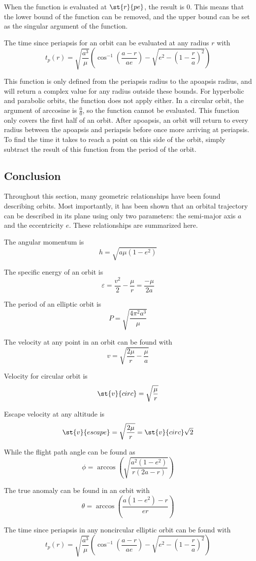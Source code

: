 \documentclass[../basicOrbitalDynamics.tex]{subfiles}
\begin{document}
When the function is evaluated at $\st{r}{pe}$, the result is $0$. This means that the lower bound of the function can be removed, and the upper bound can be set as the singular argument of the function.

The time since periapsis for an orbit can be evaluated at any radius $r$ with
\begin{equation}\label{Time since periapsis}
    t_p(r)=\sqrt{\frac{a^3}{\mu}}\left(\cos^{-1}\left(\frac{a-r}{ae}\right)- \sqrt{e^2-\left(1-\frac{r}{a}\right)^2}\right)
\end{equation}

This function is only defined from the periapsis radius to the apoapsis radius, and will return a complex value for any radius outside these bounds. For hyperbolic and parabolic orbits, the function does not apply either. In a circular orbit, the argument of arccosine is $\frac{0}{0}$, so the function cannot be evaluated. This function only covers the first half of an orbit. After apoapsis, an orbit will return to every radius between the apoapsis and periapsis before once more arriving at periapsis. To find the time it takes to reach a point on this side of the orbit, simply subtract the result of this function from the period of the orbit.

\bigskip\bigskip
\subsection{Conclusion}

Throughout this section, many geometric relationships have been found describing orbits. Most importantly, it has been shown that an orbital trajectory can be described in its plane using only two parameters: the semi-major axis $a$ and the eccentricity $e$. These relationships are summarized here.

\bigskip
The angular momentum is
$$h=\sqrt{a\mu(1-e^2)}$$

\bigskip
The specific energy of an orbit is
$$\varepsilon=\frac{v^2}{2}-\frac{\mu}{r}=\frac{-\mu}{2a}$$

\bigskip
The period of an elliptic orbit is
$$P=\sqrt{\frac{4\pi^2a^3}{\mu}}$$

\bigskip
The velocity at any point in an orbit can be found with
$$v=\sqrt{\frac{2\mu}{r}-\frac{\mu}{a}}$$

Velocity for circular orbit is
$$\st{v}{circ}=\sqrt{\frac{\mu}{r}}$$

Escape velocity at any altitude is
$$\st{v}{escape}=\sqrt{\frac{2\mu}{r}}=\st{v}{circ}\sqrt{2}$$

\bigskip
While the flight path angle can be found as
$$\phi=\arccos\left(\sqrt{\frac{a^2(1-e^2)}{r(2a-r)}}\right)$$

\bigskip
The true anomaly can be found in an orbit with
$$\theta=\arccos\left(\frac{a(1-e^2)-r}{er}\right)$$

\bigskip
The time since periapsis in any noncircular elliptic orbit can be found with
$$t_p(r)=\sqrt{\frac{a^3}{\mu}}\left(\cos^{-1}\left(\frac{a-r}{ae}\right)- \sqrt{e^2-\left(1-\frac{r}{a}\right)^2}\right)$$
\end{document}

